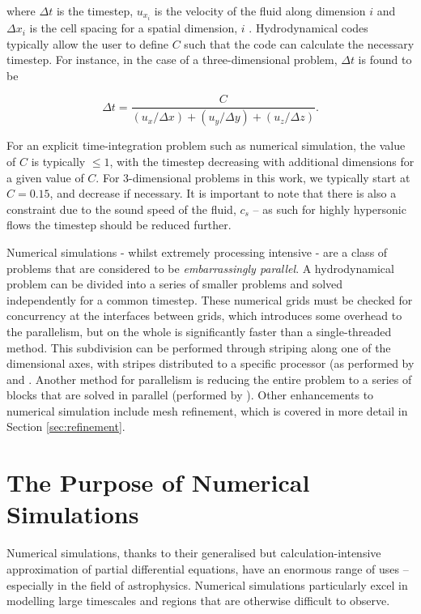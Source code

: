 \noindent
where $\Delta t$ is the timestep, $u_{x_i}$ is the velocity of the fluid along dimension $i$ and $\Delta x_i$ is the cell spacing for a spatial dimension, $i$ \parencite[Ch.~5]{toro_riemann_2013}.
Hydrodynamical codes typically allow the user to define $C$ such that the code can calculate the necessary timestep.
For instance, in the case of a three-dimensional problem, $\Delta t$ is found to be

\begin{equation}
  \Delta t = \frac{C}{(u_x/\Delta x) + (u_y/\Delta y) + (u_z/\Delta z)}.
\end{equation}

\noindent
For an explicit time-integration problem such as numerical simulation, the value of $C$ is typically $\leq 1$, with the timestep decreasing with additional dimensions for a given value of $C$.
For 3-dimensional problems in this work, we typically start at $C = 0.15$, and decrease if necessary.
It is important to note that there is also a constraint due to the sound speed of the fluid, $c_s$ -- as such for highly hypersonic flows the timestep should be reduced further.

Numerical simulations - whilst extremely processing intensive - are a class of problems that are considered to be \emph{embarrassingly parallel}.
A hydrodynamical problem can be divided into a series of smaller problems and solved independently for a common timestep.
These numerical grids must be checked for concurrency at the interfaces between grids, which introduces some overhead to the parallelism, but on the whole is significantly faster than a single-threaded method.
This subdivision can be performed through striping along one of the dimensional axes, with stripes distributed to a specific processor (as performed by \mg{} and .
Another method for parallelism is reducing the entire problem to a series of blocks that are solved in parallel (performed by \athena). 
Other enhancements to numerical simulation include mesh refinement, which is covered in more detail in Section \ref{sec:refinement}.

\section{The Purpose of Numerical Simulations}
\label{sec:numerical-purpose}

Numerical simulations, thanks to their generalised but calculation-intensive approximation of partial differential equations, have an enormous range of uses -- especially in the field of astrophysics.
Numerical simulations particularly excel in modelling large timescales and regions that are otherwise difficult to observe.

